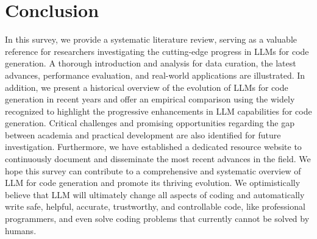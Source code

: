 \section{Conclusion}\label{sec:conclusion}
In this survey, we provide a systematic literature review, serving as a valuable reference for researchers investigating the cutting-edge progress in LLMs for code generation. A thorough introduction and analysis for data curation, the latest advances, performance evaluation,  and real-world applications are illustrated.  
In addition, we present a historical overview of the evolution of LLMs for code generation in recent years and offer an empirical comparison using the widely recognized  to highlight the progressive enhancements in LLM capabilities for code generation. 
Critical challenges and promising opportunities regarding the gap between academia and practical development are also identified for future investigation. 
Furthermore, we have established a dedicated resource website to continuously document and disseminate the most recent advances in the field.
We hope this survey can contribute to a comprehensive and systematic overview of LLM for code generation and promote its thriving evolution. 
We optimistically believe that LLM will ultimately change all aspects of coding and automatically write safe, helpful, accurate, trustworthy, and controllable code, like professional programmers, and even solve coding problems that currently cannot be solved by humans.